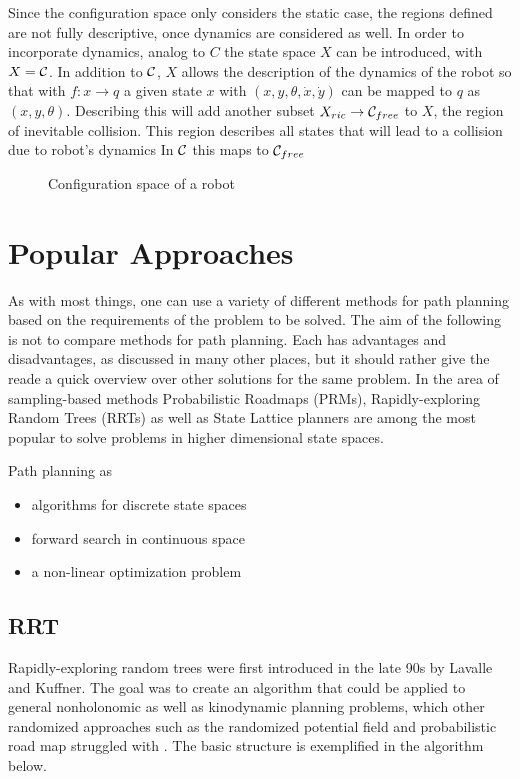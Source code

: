 Since the configuration space only considers the static case, the regions defined are not fully descriptive, once dynamics are considered as well. In order to incorporate dynamics, analog to $C$ the state space $X$ can be introduced, with $X = \mathcal{C}$. In addition to $\mathcal{C}$, $X$ allows the description of the dynamics of the robot so that with $f: x \to q$ a given state $x$ with $(x,y,\theta,\dot{x},\dot{y})$ can be mapped to $q$ as $(x,y,\theta)$. Describing this will add another subset $X_{ric} \to \mathcal{C}_{free}$ to $X$, the region of inevitable collision. This region describes all states that will lead to a collision due to robot's dynamics In $\mathcal{C}$ this maps to $\mathcal{C}_{free}$

\begin{figure}[h]
    \caption{Configuration space of a robot}
    \label{fig:configurationSpace}
\end{figure}

\section{Popular Approaches}
As with most things, one can use a variety of different methods for path planning based on the requirements of the problem to be solved. The aim of the following is not to compare methods for path planning. Each has advantages and disadvantages, as discussed in many other places, but it should rather give the reade a quick overview over other solutions for the same problem. In the area of sampling-based methods Probabilistic Roadmaps (PRMs), Rapidly-exploring Random Trees (RRTs) as well as State Lattice planners are among the most popular to solve problems in higher dimensional state spaces.

Path planning as 

\begin{itemize}
    \item algorithms for discrete state spaces
    \item forward search in continuous space
    \item a non-linear optimization problem
\end{itemize}

\subsection{RRT}
Rapidly-exploring random trees were first introduced in the late 90s by Lavalle and Kuffner. The goal was to create an algorithm that could be applied to general nonholonomic as well as kinodynamic planning problems, which other randomized approaches such as the randomized potential field and probabilistic road map struggled with \cite{Lavalle.1998}. The basic structure is exemplified in the algorithm below.

